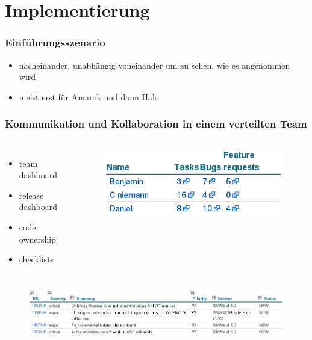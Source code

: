 \documentclass{beamer}
\begin{document}
\section{Implementierung}

\begin{frame}
\frametitle{Einf\"uhrungsszenario}
\begin{itemize}
 \item nacheinander, unabh\"angig voneinander um zu sehen, wie es angenommen wird
 \item meist erst f\"ur Amarok und dann Halo
\end{itemize}
\end{frame}

\begin{frame}
\frametitle{Kommunikation und Kollaboration in einem verteilten Team}
\begin{columns}
   \begin{itemize}
     \item team dashboard
     \item release dashboard
     \item code ownership
     \item checklists
   \end{itemize}
   \begin{figure}
     \includegraphics[scale=0.4,keepaspectratio=true]{./TeamDashboardTable.png}
   \end{figure}
\end{columns}
   \begin{figure}
     \includegraphics[scale=0.45,keepaspectratio=true]{./bugListHalo.png}
   \end{figure}
\end{frame}
\end{document}
